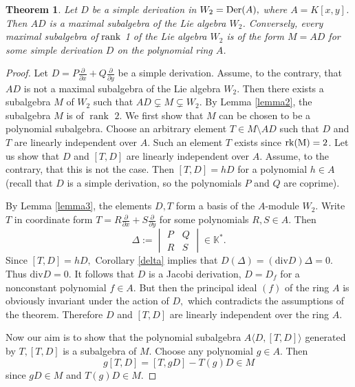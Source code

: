 \documentclass[12pt,a4paper]{amsart}
\theoremstyle{plain}
\newtheorem{theorem}{Theorem}
\theoremstyle{definition}
\begin{document}
{	
	\begin{theorem}\label{th2}
		Let $D$ be a simple derivation in $W_{2}={\rm{Der}}(A),$ where  $ A=K[x, y]$. Then $AD$ is a maximal subalgebra of the Lie algebra $W_{2}$. Conversely, every maximal subalgebra of $\rm{rank}$ 1 of the Lie algebra $W_{2}$ is of  the form $M =AD$ for some simple derivation $D$ on the polynomial ring $A$.
	\end{theorem} 
	
	\begin{proof}
		Let $D = P \frac{\partial}{\partial x} + Q \frac{\partial}{\partial y}$ be a simple derivation. Assume, to the contrary, that $AD$ is not a maximal subalgebra of the Lie algebra $W_{2}$. Then there exists a subalgebra $M$ of $W_{2}$ such that $AD \subsetneq M \subsetneq W_{2}$. By Lemma \ref{lemma2}, the subalgebra $M$ is of $\operatorname{rank}$ $2$. We first show   that  $M$ can be chosen to be  a polynomial subalgebra. Choose  an arbitrary  element $T \in M \setminus AD$ such that $D$ and $T$ are linearly independent over $A.$ Such an element  $T$  exists since $\rm{rk}(M) = 2$. Let us show that $D$ and $[T, D]$ are linearly independent over $A$. Assume, to the contrary, that this is not the case. Then $[T, D] = hD$ for a polynomial $h \in A$ (recall that $D$ is a simple derivation, so the polynomials $P$ and $Q$ are coprime).
		
		By Lemma \ref{lemma3}, the elements $D, T$ form a basis of the $A$-module $W_{2}$. Write $T$ in coordinate form $T = R\frac{\partial}{\partial x} + S\frac{\partial}{\partial y}$ for some polynomials $R, S\in A.$ Then 
		$$
		\Delta :=  \begin{vmatrix}
			P & Q \\ R & S
		\end{vmatrix} \in \mathbb{K}^*.$$
		Since $[T, D] = hD,$  Corollary \ref{delta} implies  that  $D(\Delta) = (\mathrm{div}D)\Delta = 0.$ 
		Thus $\mathrm{div}D = 0$. It follows that $D$ is a Jacobi derivation, $D=D_{f}$ for a nonconstant polynomial  $f \in A.$ But then the  principal ideal  $(f)$ of the ring $A$  is obviously invariant under the  action of $D,$ which	contradicts the assumptions of the theorem.		Therefore $D$ and $[T, D]$ are linearly independent over the ring $A$.
		
		Now our aim is to show that the polynomial subalgebra $A\langle D, [T, D] \rangle$ generated by $T, [T, D]$ is a  subalgebra of  $M$.		
		Choose any polynomial $g \in A$. Then
		\[
		g[T, D] = [T, gD] - T(g)D \in M
		\]
		since $gD \in M$ and $T(g)D \in M$.
		

\end{proof}}
\end{document}
